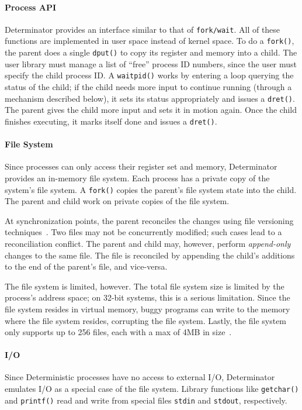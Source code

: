 \paragraph{Process API}
Determinator provides an interface similar to that of {\tt fork/wait}.
All of these functions are implemented in user space instead of kernel space.
To do a {\tt fork()}, the parent does a single {\tt dput()} to copy its register
and memory into a child. The user library must manage a list of ``free'' process
ID numbers, since the user must specify the child process ID. A {\tt waitpid()}
works by entering a loop querying the status of the child; if the child needs
more input to continue running (through a mechanism described below), it
sets its status appropriately and issues a {\tt dret()}. The parent gives the
child more input and sets it in motion again. Once the child finishes executing,
it marks itself done and issues a {\tt dret()}.

\paragraph{File System}
Since processes can only access their register set and memory, Determinator
provides an in-memory file system. Each process has a private copy of the
system's file system. A {\tt fork()} copies the parent's file system state into
the child. The parent and child work on private copies of the file system.

At synchronization points, the parent reconciles the changes using file
versioning techniques~\cite{parker1983detection}. Two files may not be
concurrently modified; such cases lead to a reconciliation conflict. The parent
and child may, however, perform \emph{append-only} changes to the same file.
The file is reconciled by appending the child's additions to the end of the
parent's file, and vice-versa.

The file system is limited, however. The total file system size is limited
by the process's address space; on 32-bit systems, this is a serious limitation.
Since the file system resides in virtual memory, buggy programs can write to
the memory where the file system resides, corrupting the file system. Lastly,
the file system only supports up to 256 files, each with a max of 4MB in
size~\cite{Aviram10cloud}.

\paragraph{I/O}
Since Deterministic processes have no access to external I/O, Determinator
emulates I/O as a special case of the file system. Library functions like
{\tt getchar()} and {\tt printf()} read and write from special files
{\tt stdin} and {\tt stdout}, respectively.

